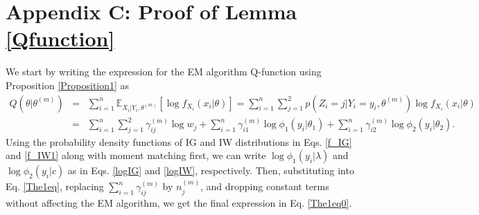 \documentclass[12pt, draftclsnofoot, onecolumn]{IEEEtran}
\theoremstyle{plain}
\begin{document}
\section*{Appendix C: Proof of Lemma \ref{Qfunction}}\vspace{-.05in}
We start by writing the expression for the EM algorithm Q-function using Proposition \ref{Proposition1} as
 \begin{eqnarray}
 Q({\theta}|{\theta}^{(m)})%
 &=& \sum_{i=1}^n \mathbb{E}_{X_i|Y_i,\theta^{(m)}} \left[ \log f_{X_i} (x_i|\theta)\right] %
 =\sum_{i=1}^n \sum_{j=1}^2 p(Z_i=j|Y_i=y_i,\theta^{(m)}) \log f_{X_i} (x_i|\theta)\nonumber\\
 &=& \sum_{i=1}^n \sum_{j=1}^2 \gamma_{ij}^{(m)} \log w_j + \sum_{i=1}^n \gamma_{i1}^{(m)} \log \phi_1(y_i|\theta_1) + \sum_{i=1}^n \gamma_{i2}^{(m)} \log \phi_2(y_i|\theta_2). \label{The1eq}
 \end{eqnarray}
 Using the probability density functions of IG and IW distributions in Eqs. \eqref{f_IG} and \eqref{f_IW1} along with moment matching first, we can write $\log \phi_1(y_i|\lambda)$ and $\log \phi_2(y_i|c)$ as in Eqs. \eqref{logIG} and \eqref{logIW}, respectively. Then, substituting into Eq. \eqref{The1eq}, replacing $\sum_{i=1}^n \gamma_{ij}^{(m)}$ by $n_j^{(m)}$, %
 and dropping %
 constant terms %
 without affecting the EM algorithm, we get the final expression in Eq. \eqref{The1eq0}. %
\vspace{-.1in}
\end{document}
